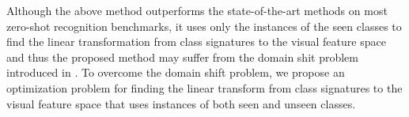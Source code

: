 \documentclass[10pt,twocolumn,letterpaper]{article}
\begin{document}



Although the above method outperforms the state-of-the-art methods on most zero-shot recognition benchmarks, it uses only the instances of the seen classes to find the linear transformation from class signatures to the visual feature space and thus the proposed method may suffer from the domain shit problem introduced in \cite{eccv14}.
To overcome the domain shift problem, we propose an optimization problem for finding the linear transform from class signatures to the visual feature space that uses instances of both seen and unseen classes. 
\end{document}
